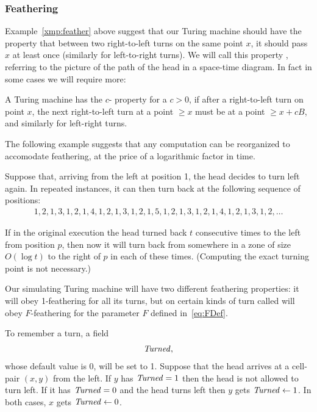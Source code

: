 \documentclass[11pt]{memoir}
\theoremstyle{definition} %
\renewcommand{\ge}{\geq}
\newcommand{\fld}[1]{\ensuremath{\textit{#1\/}}}
\def\B{B}
\newcommand{\F}{F}
\newcommand{\Turned}{\fld{Turned}} %
\begin{document}
\subsubsection{Feathering}\label{sec:feathering}

Example~\ref{xmp:feather} above suggest that our Turing machine
should have the property that between two right-to-left turns
on the same point \( x \), it should pass \( x \) at least once (similarly for left-to-right turns).
We will call this property ,
referring to the picture of the path of the head in a space-time diagram.
In fact in some cases we will require more:

\begin{definition}\label{def:feathering}
  A Turing machine has the \( c \)- property for a \( c>0 \), if  after
a right-to-left turn on point \( x \), the next right-to-left turn at a point \( \ge x \)
must be at a point \( \ge x + c\B \), and similarly for left-right turns.  
\end{definition}

 The following example suggests that any computation can be reorganized to accomodate feathering,
at the price of a logarithmic factor in time.

\begin{example}\label{xmp:feathering}
Suppose that, arriving from the left at position 1, the head decides to turn left again.
In repeated instances, it can then turn back at the following sequence of positions:
\begin{align*}
 1, 2, 1, 3, 1, 2, 1, 4, 1, 2, 1, 3, 1, 2, 1, 5, 1, 2, 1, 3, 1, 2, 1, 4, 1, 2, 1, 3, 1, 2, \dots
 \end{align*}
\end{example}

If in the original execution the head turned back \( t \) consecutive
times to the left from position \( p \), then now it will 
turn back from somewhere in a zone of size \( O(\log t) \) to the right of \( p \) in 
each of these times.
(Computing the exact turning point is not necessary.)

Our simulating Turing machine will have two different feathering properties: it will 
obey 1-feathering for all its turns, but on certain kinds of turn called 
will obey \( \F \)-feathering for the parameter \( \F \) defined in~\eqref{eq:FDef}.

To remember a turn, a field
\begin{align*}
 \Turned,
\end{align*}
whose default value is 0, will be set to 1.
Suppose that the head arrives at a cell-pair \( (x,y) \) from the left.
If \( y \) has \( \Turned=1 \) then the head is not allowed to turn left.
If it has \( \Turned=0 \) and the head turns left then \( y \) gets \( \Turned\gets 1 \).
In both cases, \( x \) gets \( \Turned\gets 0 \).
\end{document}

